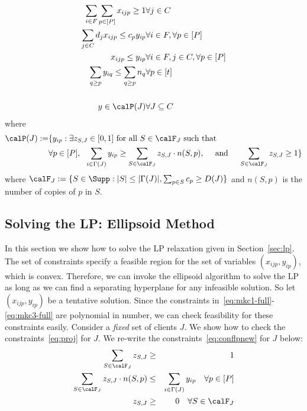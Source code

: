 \begin{eqnarray}
\sum_{i\in F} \sum_{p\in [P]}  x_{ijp} \geq 1 & \forall j\in C  \label{eq:mkc1-full} \\
\sum_{j\in C} d_j x_{ijp} \leq c_p y_{ip} & \forall i \in F, \forall p\in [P] \label{eq:mkc2-full} \\
x_{ijp} \leq y_{ip} & \forall i\in F, j\in C,\forall p\in [P] \label{eq:mkc3-full}\\
\sum_{q \geq p} y_{iq}   \leq \sum_{q\geq p} n_q & \forall p\in [t] \label{eq:mkc4-full}\\
\nonumber \\
y \in \calP(J) & \forall J\subseteq C \label{eq:proj}
\end{eqnarray}
\noindent
where
\begin{eqnarray}
\calP(J) := & \{ y_{ip}: \exists z_{S,J}\in [0,1] \textrm{ for all } S\in \calF_J \textrm{ such that }  \notag \\
& \forall p\in [P], ~~ \sum_{i\in \Gamma(J)} y_{ip} \geq \sum_{S\in \calF_{J}} z_{S,J}\cdot n(S,p), ~~~~ \textrm{and}~~~~ \sum_{S\in \calF_{J}} z_{S,J} \geq 1 \} \label{eq:conflpnew}
\end{eqnarray}
where $\calF_{J} := \{S\in \Supp: |S| \leq |\Gamma(J)|, \sum_{p\in S} c_p \geq D(J)\}$ and $n(S,p)$ is the number of copies of  $p$ in $S$. \bigskip


\subsection{Solving the LP: Ellipsoid Method}
\label{sec:ellipsoid}
In this section we show how to solve the LP relaxation given in Section~\ref{sec:lp}. The set of constraints specify a feasible region for the set of variables $(x_{ijp}, y_{ip})$, which is convex. Therefore, we can invoke the ellipsoid algorithm to solve the LP as long as we can find a separating hyperplane for any infeasible solution. So let $(x_{ijp}, y_{ip})$ be a tentative solution. Since the  constraints in~\eqref{eq:mkc1-full}-\eqref{eq:mkc3-full} are polynomial in number, we can check feasibility for these constraints easily. Consider a {\em fixed} set  of clients $J$.
We show how to check the constraints~\eqref{eq:proj} for $J$. We re-write the constraints~\eqref{eq:conflpnew} for $J$ below:
\begin{eqnarray*}
\sum_{S \in \calF_J} z_{S,J} & \geq & 1 \\
\sum_{S\in \calF_{J}} z_{S,J}\cdot n(S,p) &\leq  & \sum_{i\in \Gamma(J)} y_{ip}  \ \ \ \forall p \in [P] \\
z_{S,J} & \geq &  0 \ \ \ \forall S \in \calF_J
\end{eqnarray*}

